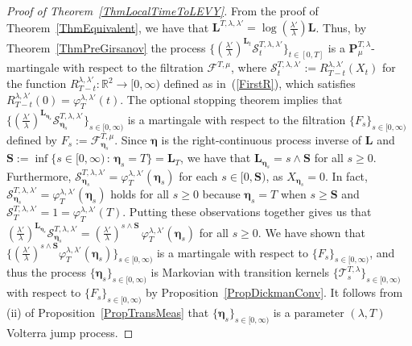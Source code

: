 \documentclass[10pt]{article}
\numberwithin{equation}{section}
\theoremstyle{definition}
\newcommand{\R}{{\mathbb R}}
\begin{document}
\begin{proof}[Proof of Theorem~\ref{ThmLocalTimeToLEVY}]   From the proof of Theorem~\ref{ThmEquivalent}, we have that $\mathbf{L}^{T,\lambda,\lambda'}=\log(\frac{\lambda'}{\lambda}) \mathbf{L}$.  Thus, by Theorem~\ref{ThmPreGirsanov}  the process $\{ (\frac{\lambda'}{\lambda})^{\mathbf{L}_{t} } \mathcal{S}_{t}^{T,\lambda,\lambda'}\}_{t\in [0,T]} $ is a $\mathbf{P}^{T,\lambda}_{\mu}$-martingale with respect to the filtration $\mathscr{F}^{T,\mu}$, where  $\mathcal{S}_{t}^{T,\lambda,\lambda'}:=R^{\lambda,\lambda'}_{T-t}(X_t)$  for  the function $R^{\lambda,\lambda'}_{T-t}:\R^2\rightarrow [0,\infty)$ defined as in~(\ref{FirstR}), which satisfies $R^{\lambda,\lambda'}_{T-t}(0) =\varphi^{\lambda,\lambda'}_T(t) $.  The optional stopping theorem implies that  $\{ (\frac{\lambda'}{\lambda})^{\mathbf{L}_{\boldsymbol{\eta}_s} }\mathcal{S}_{\boldsymbol{\eta}_s}^{T,\lambda,\lambda'}\}_{s\in [0,\infty)} $ is  a martingale with respect to the filtration $\{ F_s\}_{s\in [0,\infty)}$ defined by $F_s:=\mathscr{F}_{\boldsymbol{\eta}_s }^{T,\mu}$. Since $\boldsymbol{\eta}$ is the right-continuous process inverse of $\mathbf{L}$ and $\mathbf{S}:=\inf\{s\in [0,\infty) \,:\, \boldsymbol{\eta}_s=T  \}=\mathbf{L}_T$, we have that $\mathbf{L}_{\boldsymbol{\eta}_s} = s\wedge \mathbf{S} $ for all $s\geq 0$. Furthermore, $\mathcal{S}_{\boldsymbol{\eta}_s}^{T,\lambda,\lambda'}=\varphi^{\lambda,\lambda'}_T(\boldsymbol{\eta}_s) $ for each $s\in [0,\mathbf{S})$, as $X_{ \boldsymbol{\eta}_s }=0$.  In fact, $\mathcal{S}_{\boldsymbol{\eta}_s}^{T,\lambda,\lambda'}=\varphi^{\lambda,\lambda'}_T(\boldsymbol{\eta}_s) $ holds for all $s\geq 0$ because $\boldsymbol{\eta}_s=T$ when $s\geq \mathbf{S}$ and   $\mathcal{S}_{T}^{T,\lambda,\lambda'}=1=\varphi^{\lambda,\lambda'}_T(T) $. Putting these observations together gives us that $ (\frac{\lambda'}{\lambda})^{\mathbf{L}_{\boldsymbol{\eta}_s} }\mathcal{S}_{\boldsymbol{\eta}_s}^{T,\lambda,\lambda'}= (\frac{\lambda'}{\lambda})^{s\wedge \mathbf{S}}\,\varphi^{\lambda,\lambda'}_T(\boldsymbol{\eta}_s)$ for all $s\geq 0$. We have shown that  $\{ (\frac{\lambda'}{\lambda})^{s\wedge \mathbf{S}}\varphi^{\lambda,\lambda'}_T(\boldsymbol{\eta}_s) \}_{s\in [0,\infty)}$ is a martingale with respect to $\{ F_s\}_{s\in [0,\infty)}$, and thus the process $\{ \boldsymbol{\eta}_s\}_{s\in [0,\infty)}$  is Markovian with transition kernels $\{ \mathscr{T}^{T,\lambda}_s\}_{s\in [0,\infty)}  $ with respect to $\{  F_s\}_{s\in [0,\infty)}$ by Proposition~\ref{PropDickmanConv}.  It follows from (ii) of Proposition~\ref{PropTransMeas} that $\{ \boldsymbol{\eta}_s\}_{s\in [0,\infty)}$ is a parameter $(\lambda,T)$ Volterra jump process.
\end{proof}
\end{document}
